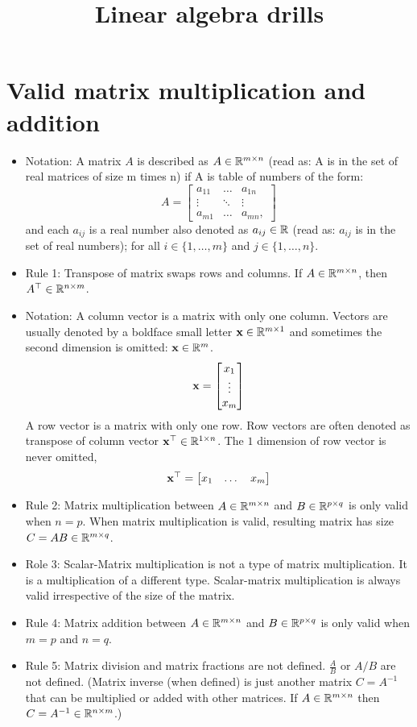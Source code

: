 \documentclass[twocolumn]{article}
\title{Linear algebra drills}
\begin{document}
\maketitle
\section{Valid matrix multiplication and addition}
\begin{itemize}
\item  Notation: A matrix $A$ is described as $A \in \mathbb{R}^{m \times n}$ (read
  as: A is in
  the set of real matrices of size m times n) if A is table of numbers of the form:
  \[
    A = \begin{bmatrix}
      a_{11} & \dots & a_{1n} \\
      \vdots & \ddots & \vdots \\
      a_{m1} & \dots & a_{mn},
      \end{bmatrix}
 \] and each $a_{ij}$ is a real number also denoted as $a_{ij} \in \mathbb{R}$ (read
 as: $a_{ij}$ is in the set of real numbers); for all $i \in \{1, \dots, m\}$
 and $j \in \{1, \dots, n\}$.
\item Rule 1: Transpose of matrix swaps rows and columns. If $A \in \mathbb{R}^{m
    \times n}$, then $A^\top \in \mathbb{R}^{n \times m}$.
 \item Notation: A column vector is a matrix with only one column. Vectors are
   usually denoted by a boldface small letter $\mathbf{x} \in \mathbb{R}^{m \times 1}$ and
   sometimes the second dimension is omitted: $\mathbf{x} \in \mathbb{R}^{m}$.
   \[
     \mathbf{x} = \begin{bmatrix}
       x_1\\ \vdots \\ x_m
       \end{bmatrix}
   \]
   A row vector
   is a matrix with only one row. Row vectors are often denoted as transpose of
   column vector $\mathbf{x}^\top \in \mathbb{R}^{1 \times n}$. The $1$ dimension of row
   vector is never omitted, 
   \[
     \mathbf{x}^\top = \begin{bmatrix}
       x_1& \dots & x_m
     \end{bmatrix}
   \]
\item Rule 2: Matrix multiplication between $A \in \mathbb{R}^{m \times n}$ and $B \in \mathbb{R}^{p
  \times q}$ is only valid when $n = p$. When matrix multiplication is valid,
resulting matrix has size $C = AB \in
\mathbb{R}^{m \times q}$.
\item Role 3: Scalar-Matrix multiplication is not a type of matrix
  multiplication. It is a multiplication of a different type. Scalar-matrix
  multiplication is always valid irrespective of the size of the matrix. 
\item Rule 4: Matrix addition between $A \in \mathbb{R}^{m \times n}$ and $B \in \mathbb{R}^{p
    \times q}$ is only valid when $m = p$ and $n = q$.
  \item Rule 5: Matrix division and matrix fractions are not defined.
    $\frac{A}{B}$ or $A / B$ are not defined. (Matrix inverse (when defined) is
     just another matrix $C = A^{-1}$ that can be multiplied or
     added with other matrices. If $A \in \mathbb{R}^{m \times n}$ then $C = A^{-1}
     \in \mathbb{R}^{n \times m}$.)
\end{itemize}
\end{document}
